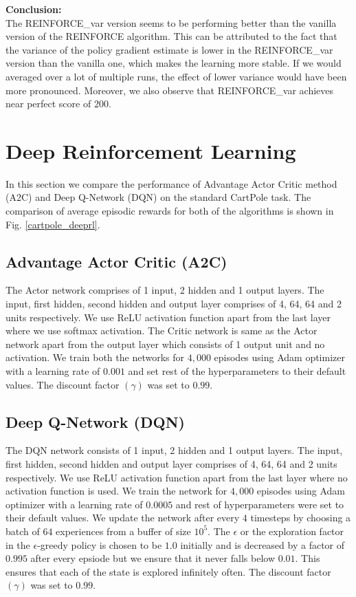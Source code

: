 \documentclass{article}
\begin{document}
    \noindent %
    \textbf{Conclusion:} \\
    The REINFORCE\_var version seems to be performing better than the vanilla version of the REINFORCE algorithm. This can be
    attributed to the fact that the variance of the policy gradient estimate is lower in the REINFORCE\_var version than the
    vanilla one, which makes the learning more stable. If we would averaged over a lot of multiple runs, the effect of lower
    variance would have been more pronounced. Moreover, we also observe that REINFORCE\_var achieves near perfect score of $200$.
    
\section{Deep Reinforcement Learning}
    In this section we compare the performance of Advantage Actor Critic method (A2C) and Deep Q-Network (DQN) on the standard CartPole task. The comparison of average episodic 
    rewards for both of the algorithms is shown in Fig. \ref{cartpole_deeprl}.
    \subsection{Advantage Actor Critic (A2C)}
    The Actor network comprises of 1 input, 2 hidden and 1 output layers. The input, first hidden, second hidden and output layer comprises of 4, 64, 64 and 2 units respectively.
    We use ReLU activation function apart from the last layer where we use softmax activation.
    The Critic network is same as the Actor network apart from the output layer which consists of 1 output unit and no activation. We train both the networks for $4,000$ episodes using Adam 
    optimizer with a learning rate of $0.001$ and set rest of the hyperparameters to their default values. The discount factor $(\gamma)$ was set to $0.99$.

    \subsection{Deep Q-Network (DQN)}
    The DQN network consists of 1 input, 2 hidden and 1 output layers. The input, first hidden, second hidden and output layer comprises of 4, 64, 64 and 2 units respectively.
    We use ReLU activation function apart from the last layer where no activation function is used. We train the network for $4,000$ episodes using Adam optimizer with a learning rate of $0.0005$ 
    and rest of hyperparameters were set to their default values. We update the network after every $4$ timesteps by choosing a batch of $64$ experiences from a buffer of size $10^{5}$.
    The $\epsilon$ or the exploration factor 
    in the $\epsilon$-greedy policy is chosen to be $1.0$ initially and is decreased by a factor of $0.995$ after every epsiode but we ensure that it never falls below $0.01$. This ensures
    that each of the state is explored infinitely often. The discount factor $(\gamma)$ was set to $0.99$.
    
\end{document}

